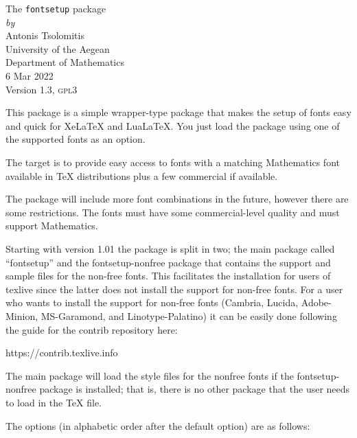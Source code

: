 \documentclass{book}
\begin{document}
  \begin{center}
    {\LARGE The \texttt{fontsetup} package}\\[1ex]
    \textit{by}\\[1ex]
    {\large Antonis Tsolomitis}\\
University of the Aegean\\ Department of Mathematics\\[1ex]
	  \textsc{6} Mar \textsc{2022}\\[1ex]
	  Version 1.3, \textsc{gpl3}
  \end{center}

  This package is a simple wrapper-type package that makes the setup of fonts easy and
  quick for XeLaTeX and LuaLaTeX. You just load the package using one of the supported
  fonts as an option.

  The target is to provide easy access to fonts with a matching Mathematics font available in
  TeX distributions plus a few commercial if available.

  The package will include more font combinations in the future, however there are
  some restrictions. The fonts must have some commercial-level quality and must support
  Mathematics.

  Starting with version 1.01 the package is split in two; the main package called ``fontsetup''
  and the fontsetup-nonfree package that contains the support and sample files for the
  non-free fonts. This facilitates the installation for users of texlive since the latter does not
  install the support for non-free fonts. For a user who wants to install the support for
  non-free fonts (Cambria, Lucida, Adobe-Minion, MS-Garamond, and Linotype-Palatino) it can be
  easily done following the guide for the contrib repository here:

  https://contrib.texlive.info

  The main package will load the style files for the nonfree fonts if the fontsetup-nonfree
  package is installed; that is, there is no other package that the user needs to
  load in the TeX file.
  
  The options (in alphabetic order after the default option) are as follows:
\end{document}
